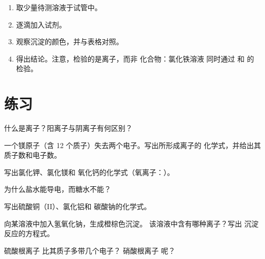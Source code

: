 \begin{method}[离子的检验]\label{met:g9:ions:test}
\begin{enumerate}
  \item 取少量待测溶液于试管中。
  \item 逐滴加入试剂。
  \item 观察沉淀的颜色，并与表格对照。
  \item 得出结论。注意，检验的是离子，而非
        化合物：氯化铁溶液
        同时通过  和  的检验。
\end{enumerate}
\end{method}

\section{练习}

\begin{exercise}[$\star$]\label{exo:g9:ions:1}
什么是离子？阳离子与阴离子有何区别？
\end{exercise}

\begin{exercise}[$\star$]\label{exo:g9:ions:2}
一个镁原子（含 12 个质子）失去两个电子。写出所形成离子的
化学式，并给出其质子数和电子数。
\end{exercise}

\begin{exercise}[$\star$]\label{exo:g9:ions:3}
写出氯化钾、氯化镁和
氧化钙的化学式（氧离子：）。
\end{exercise}

\begin{exercise}[$\star$]\label{exo:g9:ions:4}
为什么盐水能导电，而糖水不能？
\end{exercise}

\begin{exercise}[$\star\star$]\label{exo:g9:ions:5}
写出硫酸铜（II）、氯化铝和
碳酸钠的化学式。
\end{exercise}

\begin{exercise}[$\star\star$]\label{exo:g9:ions:6}
向某溶液中加入氢氧化钠，生成橙棕色沉淀。
该溶液中含有哪种离子？写出
沉淀反应的方程式。
\end{exercise}

\begin{exercise}[$\star\star$]\label{exo:g9:ions:7}
硫酸根离子  比其质子多带几个电子？
硝酸根离子  呢？
\end{exercise}

